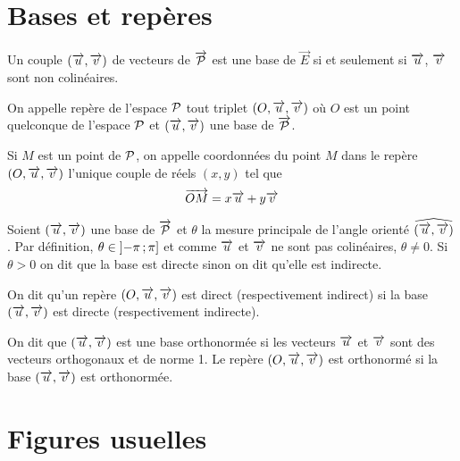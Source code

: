 \section{Bases et repères}

Un couple \((\vu,\vv)\) de vecteurs de \(\vect{\P}\) est une base de \(\vec{E}\) si et 
seulement si \(\vu\), \(\vv\) sont non colinéaires.

\begin{defdef}
  On appelle repère de l'espace \(\P\) tout triplet \((O,\vu,\vv)\) où \(O\) est un 
  point quelconque de l'espace \(\P\) et \((\vu,\vv)\) une base de \(\vect{\P}\).

  Si \(M\) est un point de \(\P\), on appelle coordonnées du point \(M\) dans le 
  repère \((O,\vu,\vv)\) l'unique couple de réels \((x,y)\) tel que
  \begin{equation}
    \vect{OM}=x\vu+y\vv
  \end{equation}
\end{defdef}

Soient \((\vu,\vv)\) une base de \(\vect{\P}\) et \(\theta\) la mesure principale de 
l'angle orienté \(\widehat{(\vu,\vv)}\). Par définition,
\(\theta \in \intervalleof{-\pi}{\pi}\) et comme \(\vu\) et \(\vv\) ne sont 
pas colinéaires, \(\theta \neq 0\). Si \(\theta >0\) 
on dit que la base est directe sinon on dit qu'elle est indirecte.

\begin{defdef}
  On dit qu'un repère \((O,\vu,\vv)\) est direct (respectivement indirect) si la base 
  \((\vu,\vv)\) est directe (respectivement indirecte).
\end{defdef}

\begin{defdef}
  On dit que \((\vu,\vv)\) est une base orthonormée si les vecteurs \(\vu\) et \(\vv\) 
  sont des vecteurs orthogonaux et de norme 1. Le repère \((O,\vu,\vv)\) est 
  orthonormé si la base \((\vu,\vv)\) est orthonormée.
\end{defdef}

\section{Figures usuelles}

